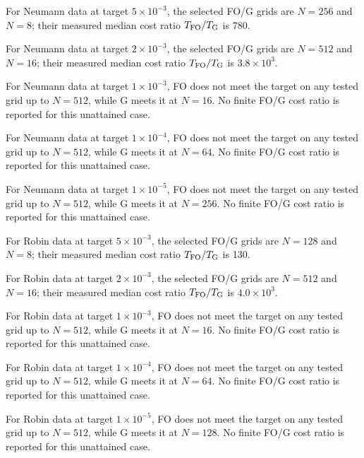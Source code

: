 For Neumann data at target $5\times10^{-3}$, the selected FO/G grids are $N=256$ and $N=8$; their measured median cost ratio $T_{\rm FO}/T_{\rm G}$ is 780. 

For Neumann data at target $2\times10^{-3}$, the selected FO/G grids are $N=512$ and $N=16$; their measured median cost ratio $T_{\rm FO}/T_{\rm G}$ is $3.8\times10^{3}$. 

For Neumann data at target $1\times10^{-3}$, FO does not meet the target on any tested grid up to $N=512$, while G meets it at $N=16$. No finite FO/G cost ratio is reported for this unattained case. 

For Neumann data at target $1\times10^{-4}$, FO does not meet the target on any tested grid up to $N=512$, while G meets it at $N=64$. No finite FO/G cost ratio is reported for this unattained case. 

For Neumann data at target $1\times10^{-5}$, FO does not meet the target on any tested grid up to $N=512$, while G meets it at $N=256$. No finite FO/G cost ratio is reported for this unattained case. 

For Robin data at target $5\times10^{-3}$, the selected FO/G grids are $N=128$ and $N=8$; their measured median cost ratio $T_{\rm FO}/T_{\rm G}$ is 130. 

For Robin data at target $2\times10^{-3}$, the selected FO/G grids are $N=512$ and $N=16$; their measured median cost ratio $T_{\rm FO}/T_{\rm G}$ is $4.0\times10^{3}$. 

For Robin data at target $1\times10^{-3}$, FO does not meet the target on any tested grid up to $N=512$, while G meets it at $N=16$. No finite FO/G cost ratio is reported for this unattained case. 

For Robin data at target $1\times10^{-4}$, FO does not meet the target on any tested grid up to $N=512$, while G meets it at $N=64$. No finite FO/G cost ratio is reported for this unattained case. 

For Robin data at target $1\times10^{-5}$, FO does not meet the target on any tested grid up to $N=512$, while G meets it at $N=128$. No finite FO/G cost ratio is reported for this unattained case. 
